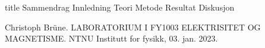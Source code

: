 \documentclass[5p]{article}
\begin{document}
{title} %
{Sammendrag}
\pagebreak
{Innledning}
{Teori}
{Metode}
{Resultat}
{Diskusjon}

\begin{thebibliography}{5}
Christoph Brüne. LABORATORIUM I FY1003 ELEKTRISITET OG MAGNETISME. NTNU Institutt for fysikk, 03. jan. 2023.
\end{thebibliography}
\end{document}
